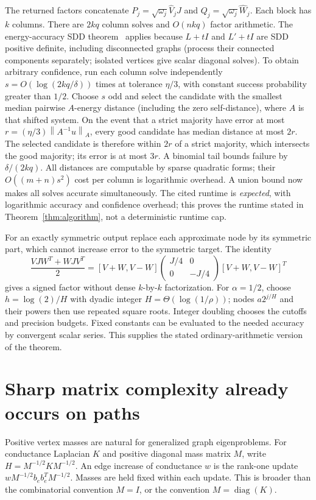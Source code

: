 \documentclass[11pt]{article}
\newcommand{\norm}[1]{\left\lVert#1\right\rVert}
\begin{document}
The returned factors concatenate
$P_j=\sqrt{\omega_j}\widehat V_jJ$ and
$Q_j=\sqrt{\omega_j}\widehat W_j$. Each block has $k$ columns.
There are $2kq$ column solves and $O(nkq)$ factor arithmetic.
The energy-accuracy SDD theorem~\cite[Theorem 4.6, Lemmas 4.3 and 4.5]{KMP}
applies because $L+tI$ and $L'+tI$ are SDD positive definite, including
disconnected graphs (process their connected components separately;
isolated vertices give scalar diagonal solves). To obtain arbitrary
confidence, run each column solve independently
$s=O(\log(2kq/\delta))$ times at tolerance $\eta/3$, with constant
success probability greater than $1/2$. Choose $s$ odd and select the
candidate with the smallest median pairwise $A$-energy distance
(including the zero self-distance),
where $A$ is that shifted system. On the event that a strict majority
have error at most $r=(\eta/3)\norm{A^{-1}u}_A$, every good candidate
has median distance at most $2r$. The selected candidate is therefore
within $2r$ of a strict majority, which intersects the good majority;
its error is at most $3r$. A binomial tail bounds failure by
$\delta/(2kq)$. All distances are computable by sparse quadratic
forms; their $O((m+n)s^2)$ cost per column is logarithmic overhead.
A union bound now makes all solves accurate simultaneously.
The cited runtime is \emph{expected}, with logarithmic accuracy and
confidence overhead; this proves the runtime stated in
Theorem~\ref{thm:algorithm}, not a deterministic runtime cap.

For an exactly symmetric output replace each approximate node by its
symmetric part, which cannot increase error to the symmetric target.
The identity
\[
 \frac{VJW^T+WJV^T}{2}
 =[V+W,V-W]\begin{pmatrix}J/4&0\\0&-J/4\end{pmatrix}[V+W,V-W]^T
\]
gives a signed factor without dense $k$-by-$k$ factorization.
For $\alpha=1/2$, choose $h=\log(2)/H$ with dyadic integer
$H=\Theta(\log(1/\rho))$; nodes $a2^{j/H}$ and their powers then use
repeated square roots. Integer doubling chooses the cutoffs and precision
budgets. Fixed constants can be evaluated to the needed accuracy by
convergent scalar series. This supplies the stated ordinary-arithmetic
version of the theorem.

\section{Sharp matrix complexity already occurs on paths}
Positive vertex masses are natural for generalized graph eigenproblems.
For conductance Laplacian $K$ and positive diagonal mass matrix $M$, write
$H=M^{-1/2}KM^{-1/2}$. An edge increase of conductance $w$ is the
rank-one update $wM^{-1/2}b_e b_e^TM^{-1/2}$. Masses are held fixed
within each update. This is broader than the combinatorial convention
$M=I$, or the convention $M=\operatorname{diag}(K)$.
\end{document}
